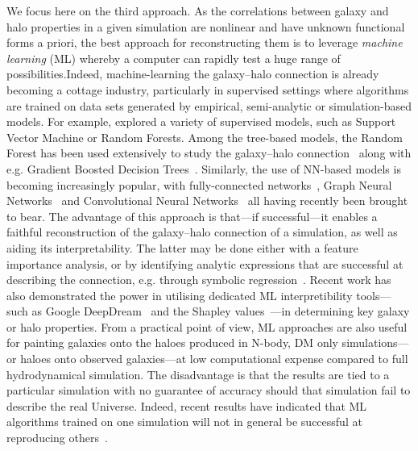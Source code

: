 \documentclass[usenatbib,useAMS]{mnras}
\begin{document}
We focus here on the third approach. As the correlations between galaxy and halo properties in a given simulation are nonlinear and have unknown functional forms a priori, the best approach for reconstructing them is to leverage \emph{machine learning} (ML) whereby a computer can rapidly test a huge range of possibilities.Indeed, machine-learning the galaxy--halo connection is already becoming a cottage industry, particularly in supervised settings where algorithms are trained on data sets generated by empirical, semi-analytic or simulation-based models. For example, \cite{vonMarttens_2021} explored a variety of supervised models, such as Support Vector Machine or Random Forests. Among the tree-based models, the Random Forest has been used extensively to study the galaxy--halo connection~\citep{Man_2019,Delgado_2021,Lovell_2021} along with e.g. Gradient Boosted Decision Trees~\citep{Chen_2021}. Similarly, the use of \ac{NN}-based models
is becoming increasingly popular, with fully-connected networks~\citep{Moster_GalaxyNet,Shao_2021}, Graph Neural Networks~\citep{Villanueva_Domingo_2021} and Convolutional Neural Networks~\citep{de_los_Rios_2021} all having recently been brought to bear. The advantage of this approach is that---if successful---it enables a faithful reconstruction of the galaxy--halo connection of a simulation, as well as aiding its interpretability. The latter may be done either with a feature importance analysis, or by identifying analytic expressions that are successful at describing the connection, e.g. through symbolic regression~\citep{Delgado_2021}. Recent work has also demonstrated the power in utilising dedicated ML interpretibility tools---such as Google DeepDream~\citep{Ntampaka2019MLDeepDream} and the Shapley values~\citep{Machado2021SHAP, Anbajagane_2022}---in determining key galaxy or halo properties. From a practical point of view, ML approaches are also useful for painting galaxies onto the haloes produced in N-body, \ac{DM} only simulations---or haloes onto observed galaxies---at low computational expense compared to full hydrodynamical simulation. The disadvantage is that the results are tied to a particular simulation with no guarantee of accuracy should that simulation fail to describe the real Universe. Indeed, recent results have indicated that ML algorithms trained on one simulation will not in general be successful at reproducing others~\citep{Villaescusa_Navarro_2021}.
\end{document}
